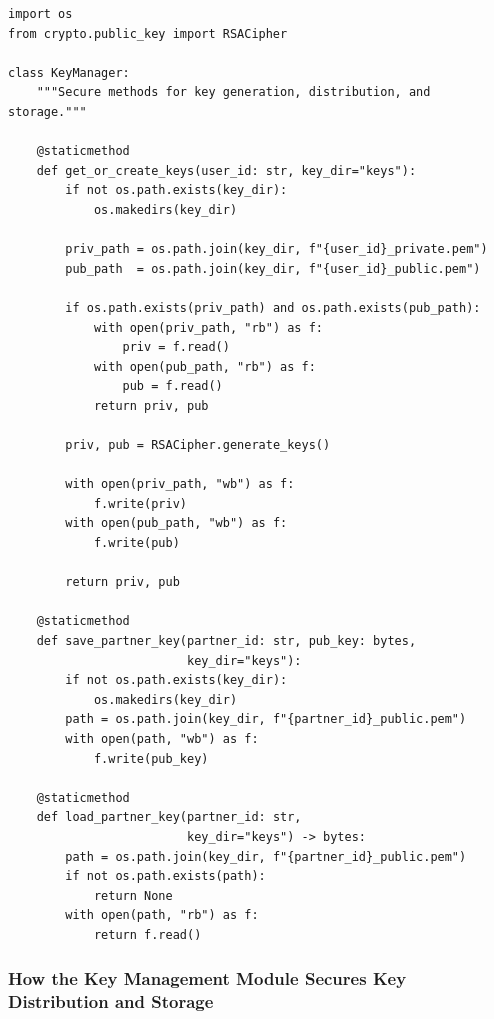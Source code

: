\documentclass[12pt,a4paper]{article}
\begin{document}
\begin{lstlisting}[caption={Key Management Module – \texttt{key\_management.py}}]
import os
from crypto.public_key import RSACipher

class KeyManager:
    """Secure methods for key generation, distribution, and storage."""

    @staticmethod
    def get_or_create_keys(user_id: str, key_dir="keys"):
        if not os.path.exists(key_dir):
            os.makedirs(key_dir)

        priv_path = os.path.join(key_dir, f"{user_id}_private.pem")
        pub_path  = os.path.join(key_dir, f"{user_id}_public.pem")

        if os.path.exists(priv_path) and os.path.exists(pub_path):
            with open(priv_path, "rb") as f:
                priv = f.read()
            with open(pub_path, "rb") as f:
                pub = f.read()
            return priv, pub

        priv, pub = RSACipher.generate_keys()

        with open(priv_path, "wb") as f:
            f.write(priv)
        with open(pub_path, "wb") as f:
            f.write(pub)

        return priv, pub

    @staticmethod
    def save_partner_key(partner_id: str, pub_key: bytes,
                         key_dir="keys"):
        if not os.path.exists(key_dir):
            os.makedirs(key_dir)
        path = os.path.join(key_dir, f"{partner_id}_public.pem")
        with open(path, "wb") as f:
            f.write(pub_key)

    @staticmethod
    def load_partner_key(partner_id: str,
                         key_dir="keys") -> bytes:
        path = os.path.join(key_dir, f"{partner_id}_public.pem")
        if not os.path.exists(path):
            return None
        with open(path, "rb") as f:
            return f.read()
\end{lstlisting}

\subsubsection{How the Key Management Module Secures Key Distribution and Storage}
\end{document}
